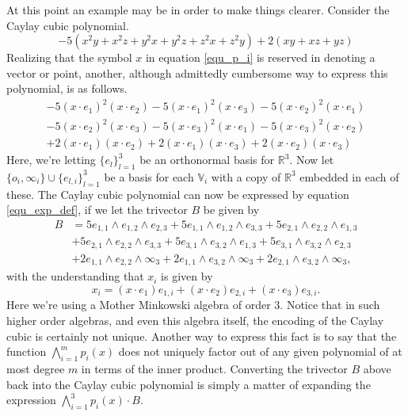 \documentclass{birkjour}
\theoremstyle{definition}
\theoremstyle{remark}
\numberwithin{equation}{section}
\newcommand{\R}{\mathbb{R}}
\newcommand{\V}{\mathbb{V}}
\newcommand{\nvai}{\infty}
\newcommand{\nvao}{o}
\begin{document}
At this point an example may be in order to make things clearer.
Consider the Caylay cubic polynomial.
\begin{equation*}
-5(x^2y + x^2z + y^2x + y^2z + z^2x + z^2y) + 2(xy + xz + yz)
\end{equation*}
Realizing that the symbol $x$ in equation \eqref{equ_p_i} is reserved in denoting
a vector or point, another, although admittedly cumbersome way to express this polynomial, is as follows.
\begin{align*}
-5(x\cdot e_1)^2(x\cdot e_2) - 5(x\cdot e_1)^2(x\cdot e_3) -5(x\cdot e_2)^2(x\cdot e_1) \\
 -5 (x\cdot e_2)^2(x\cdot e_3) -5(x\cdot e_3)^2(x\cdot e_1) -5 (x\cdot e_3)^2(x\cdot e_2) \\
+ 2(x\cdot e_1)(x\cdot e_2) + 2(x\cdot e_1)(x\cdot e_3) + 2(x\cdot e_2)(x\cdot e_3)
\end{align*}
Here, we're letting $\{e_l\}_{l=1}^3$ be an orthonormal basis for $\R^3$.  Now let
$\{\nvao_i,\nvai_i\}\cup\{e_{l,i}\}_{l=1}^3$ be a basis for each $\V_i$ with a copy of $\R^3$
embedded in each of these.  The Caylay cubic polynomial can now be expressed by
equation \eqref{equ_exp_def}, if we let the trivector $B$ be given by
\begin{align*}
B &= 5e_{1,1}\wedge e_{1,2}\wedge e_{2,3} + 5e_{1,1}\wedge e_{1,2}\wedge e_{3,3} + 5e_{2,1}\wedge e_{2,2}\wedge e_{1,3} \\
 &+ 5e_{2,1}\wedge e_{2,2}\wedge e_{3,3} + 5e_{3,1}\wedge e_{3,2}\wedge e_{1,3} + 5e_{3,1}\wedge e_{3,2}\wedge e_{2,3} \\
 & +2e_{1,1}\wedge e_{2,2}\wedge \nvai_{3} + 2e_{1,1}\wedge e_{3,2}\wedge \nvai_{3} + 2e_{2,1}\wedge e_{3,2}\wedge \nvai_{3},
\end{align*}
with the understanding that $x_i$ is given by
\begin{equation*}
x_i = (x\cdot e_1)e_{1,i} + (x\cdot e_2)e_{2,i} + (x\cdot e_3)e_{3,i}.
\end{equation*}
Here we're using a Mother Minkowski algebra of order 3.  Notice that in such higher order
algebras, and even this algebra itself, the encoding of the Caylay cubic is certainly not unique.
Another way to express this fact is to say that the function $\bigwedge_{i=1}^m p_i(x)$ does
not uniquely factor out of any given polynomial of at most degree $m$ in terms of the inner product.
Converting the trivector $B$ above back into the Caylay cubic polynomial is simply a matter
of expanding the expression $\bigwedge_{i=1}^3 p_i(x)\cdot B$.
\end{document}
